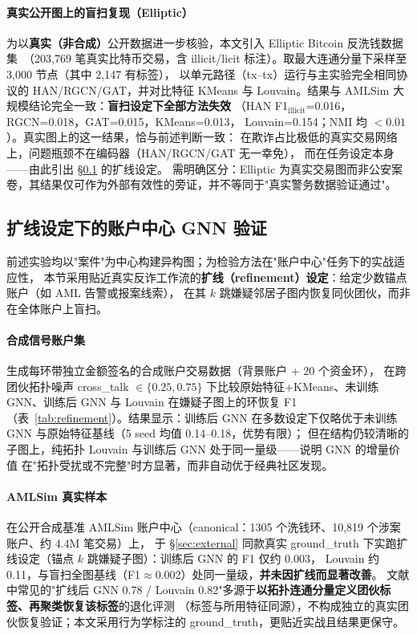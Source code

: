 \documentclass[12pt,a4paper]{ctexart}
\begin{document}
\paragraph{真实公开图上的盲扫复现（Elliptic）}
为以\textbf{真实（非合成）}公开数据进一步核验，本文引入 Elliptic Bitcoin
反洗钱数据集~\cite{weber2019elliptic}（203{,}769 笔真实比特币交易，含
illicit/licit 标注）。取最大连通分量下采样至 3{,}000 节点（其中 2{,}147 有标签），
以单元路径（tx--tx）运行与主实验完全相同协议的 HAN/RGCN/GAT，并对比特征
KMeans 与 Louvain。结果与 AMLSim 大规模结论完全一致：\textbf{盲扫设定下全部方法失效}
（HAN F1$_{\text{illicit}}$=0.016，RGCN=0.018，GAT=0.015，KMeans=0.013，
Louvain=0.154；NMI 均 $<0.01$）。真实图上的这一结果，恰与前述判断一致：
在欺诈占比极低的真实交易网络上，问题瓶颈不在编码器（HAN/RGCN/GAT 无一幸免），
而在任务设定本身——由此引出 §\ref{sec:refinement} 的扩线设定。
需明确区分：Elliptic 为真实交易图而非公安案卷，其结果仅可作为外部有效性的旁证，并不等同于"真实警务数据验证通过"。

\subsection{扩线设定下的账户中心 GNN 验证}
\label{sec:refinement}

前述实验均以"案件"为中心构建异构图；为检验方法在"账户中心"任务下的实战适应性，
本节采用贴近真实反诈工作流的\textbf{扩线（refinement）设定}：给定少数锚点账户（如 AML 告警或报案线索），
在其 $k$ 跳嫌疑邻居子图内恢复同伙团伙，而非在全体账户上盲扫。

\paragraph{合成信号账户集}
生成每环带独立金额签名的合成账户交易数据（背景账户 + 20 个资金环），
在跨团伙拓扑噪声 cross\_talk $\in \{0.25,0.75\}$ 下比较原始特征+KMeans、未训练 GNN、训练后 GNN 与 Louvain
在嫌疑子图上的环恢复 F1（表~\ref{tab:refinement}）。结果显示：训练后 GNN 在多数设定下仅略优于未训练 GNN 与原始特征基线（5 seed 均值 0.14--0.18，优势有限）；
但在结构仍较清晰的子图上，纯拓扑 Louvain 与训练后 GNN 处于同一量级——说明 GNN 的增量价值
在"拓扑受扰或不完整"时方显著，而非自动优于经典社区发现。

\paragraph{AMLSim 真实样本}
在公开合成基准 AMLSim 账户中心（canonical：1305 个洗钱环、10{,}819 个涉案账户、约 4.4M 笔交易）上，
于 §\ref{sec:external} 同款真实 ground\_truth 下实跑扩线设定（锚点 $k$ 跳嫌疑子图）：训练后 GNN 的 F1 仅约 0.003，
Louvain 约 0.11，与盲扫全图基线（F1$\approx$0.002）处同一量级，\textbf{并未因扩线而显著改善}。
文献中常见的"扩线后 GNN 0.78 / Louvain 0.82"多源于\textbf{以拓扑连通分量定义团伙标签、再聚类恢复该标签}的退化评测
（标签与所用特征同源），不构成独立的真实团伙恢复验证；本文采用行为学标注的 ground\_truth，更贴近实战且结果更保守。
\end{document}
